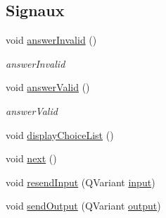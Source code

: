 \subsection*{Signaux}
\begin{DoxyCompactItemize}
\item 
void \hyperlink{classSH__QuestionState_a3348a8a683130678ac87a10ba2a25486}{answer\-Invalid} ()
\begin{DoxyCompactList}\small\item\em answer\-Invalid \end{DoxyCompactList}\item 
void \hyperlink{classSH__QuestionState_a04e259643788d15ab6244bc8a04286d6}{answer\-Valid} ()
\begin{DoxyCompactList}\small\item\em answer\-Valid \end{DoxyCompactList}\item 
void \hyperlink{classSH__DatabaseContentQuestionState_a66670db6f05e5197dc0c9e77c6d28e07}{display\-Choice\-List} ()
\item 
void \hyperlink{classSH__GenericState_a030e67a872956135c52e6876d960a7b5}{next} ()
\item 
void \hyperlink{classSH__InOutState_afa791181eb61a18d4337a04827f9b200}{resend\-Input} (Q\-Variant \hyperlink{classSH__InOutState_a04364c76d2fd8a3781e7b325955e5bd9}{input})
\item 
void \hyperlink{classSH__InOutState_ad40e929a5537eb1d4883d5aa6eee5b15}{send\-Output} (Q\-Variant \hyperlink{classSH__InOutState_a1a2fd4f34484125058e20730aaee7e46}{output})
\end{DoxyCompactItemize}
